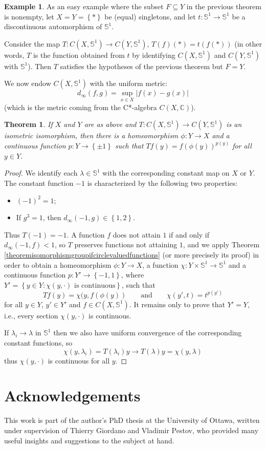 \documentclass[letter,11pt]{amsart}
\theoremstyle{plain}		\newtheorem{theorem}[generalnumbering]{Theorem}
\theoremstyle{plain}		\newtheorem{corollary}[generalnumbering]{Corollary}
\theoremstyle{definition}		\newtheorem{definition}[generalnumbering]{Definition}
\theoremstyle{definition}		\newtheorem{example}[generalnumbering]{Example}
\theoremstyle{plain}		\newtheorem{proposition}[generalnumbering]{Proposition}
\theoremstyle{plain}		\newtheorem{lemma}[generalnumbering]{Lemma}
\theoremstyle{plain}    \newtheorem{plainstyle}[generalnumbering]{\namefordifferentenvironment}
\theoremstyle{plain}    \newtheorem*{plainstyle*}{\namefordifferentenvironment}
\theoremstyle{definition}    \newtheorem{definitionstyle}[generalnumbering]{\namefordifferentenvironment}
\theoremstyle{definition}    \newtheorem*{definitionstyle*}{\namefordifferentenvironment}
\begin{document}
\begin{example}
	As an easy example where the subset $F\subseteq Y$ in the previous theorem is nonempty, let $X=Y=\left\{\ast\right\}$ be (equal) singletons, and let $t\colon\mathbb{S}^1\to\mathbb{S}^1$ be a discontinuous automorphism of $\mathbb{S}^1$.
	
	Consider the map $T\colon C(X,\mathbb{S}^1)\to C(Y,\mathbb{S}^1)$, $T(f)(\ast)=t(f(\ast))$ (in other words, $T$ is the function obtained from $t$ by identifying $C(X,\mathbb{S}^1)$ and $C(Y,\mathbb{S}^1)$ with $\mathbb{S}^1$). Then $T$ satisfies the hypotheses of the previous theorem but $F=Y$.
\end{example}

We now endow $C(X,\mathbb{S}^1)$ with the uniform metric:
\[d_\infty(f,g)=\sup_{x\in X}|f(x)-g(x)|\]
(which is the metric coming from the C*-algebra $C(X,\mathbb{C})$).

\begin{theorem}\label{theoremisometricisomorphismcirclegroups}
	If $X$ and $Y$ are as above and $T\colon C(X,\mathbb{S}^1)\to C(Y,\mathbb{S}^1)$ is an isometric isomorphism, then there is a homeomorphism $\phi\colon Y\to X$ and a continuous function $p\colon Y\to\left\{\pm 1\right\}$ such that $Tf(y)=f(\phi(y))^{p(y)}$ for all $y\in Y$.
\end{theorem}
\begin{proof}
	We identify each $\lambda\in\mathbb{S}^1$ with the corresponding constant map on $X$ or $Y$. The constant function $-1$ is characterized by the following two properties:
	\begin{itemize}
		\item $(-1)^2=1$;
		\item If $g^3=1$, then $d_\infty(-1,g)\in\left\{1,2\right\}$.
	\end{itemize}
	Thus $T(-1)=-1$. A function $f$ does not attain $1$ if and only if $d_\infty(-1,f)<1$, so $T$ preserves functions not attaining $1$, and we apply Theorem \ref{theoremisomorphismgroupifcirclevaluedfunctions} (or more precisely its proof) in order to obtain a homeomorphism $\phi\colon Y\to X$, a function $\chi\colon Y\times\mathbb{S}^1\to\mathbb{S}^1$ and a continuous function $p\colon Y'\to\left\{-1,1\right\}$, where $Y'=\left\{y\in Y:\chi(y,\cdot)\text{ is continuous}\right\}$, such that
	\[Tf(y)=\chi(y,f(\phi(y))\qquad\text{and}\qquad\chi(y',t)=t^{p(y')}\]
	for all $y\in Y$, $y'\in Y'$ and $f\in C(X,\mathbb{S}^1)$. It remains only to prove that $Y'=Y$, i.e., every section $\chi(y,\cdot)$ is continuous.
	
	If $\lambda_i\to\lambda$ in $\mathbb{S}^1$ then we also have uniform convergence of the corresponding constant functions, so
	\[\chi(y,\lambda_i)=T(\lambda_i)y\to T(\lambda)y=\chi(y,\lambda)\]
	thus $\chi(y,\cdot)$ is continuous for all $y$.
\end{proof}

\section*{Acknowledgements}
This work is part of the author's PhD thesis at the University of Ottawa, written under supervision of Thierry Giordano and Vladimir Pestov, who provided many useful insights and suggestions to the subject at hand.



\end{document}
